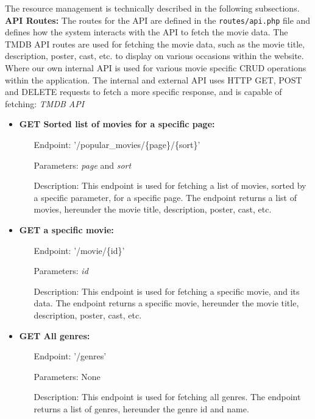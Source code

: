 The resource management is technically described in the following subsections.
\textbf{API Routes:}
The routes for the API are defined in the \texttt{routes/api.php} file and defines how the system interacts with the API to fetch the movie data. The TMDB API routes are used for fetching the movie data, such as the movie title, description, poster, cast, etc. to display on various occasions within the website. Where our own internal API is used for various movie specific CRUD operations within the application. 
The internal and external API uses HTTP GET, POST and DELETE requests to fetch a more specific response, and is capable of fetching:
\textit{TMDB API}
\begin{itemize}
    \item \textbf{GET Sorted list of movies for a specific page:}
    \begin{itemize}
        \item [Endpoint:] '/popular\_movies/\{page\}/\{sort\}'
        \item [Parameters:] \textit{page} and \textit{sort}
        \item [Description:] This endpoint is used for fetching a list of movies, sorted by a specific parameter, for a specific page. The endpoint returns a list of movies, hereunder the movie title, description, poster, cast, etc.
    \end{itemize}
    \item \textbf{GET a specific movie:}
    \begin{itemize}
        \item [Endpoint:] '/movie/\{id\}'
        \item [Parameters:] \textit{id}
        \item [Description:] This endpoint is used for fetching a specific movie, and its data. The endpoint returns a specific movie, hereunder the movie title, description, poster, cast, etc.
    \end{itemize}
    \item \textbf{GET All genres:}
    \begin{itemize}
        \item [Endpoint:] '/genres'
        \item [Parameters:] None
        \item [Description:] This endpoint is used for fetching all genres. The endpoint returns a list of genres, hereunder the genre id and name.
    \end{itemize}
\end{itemize}

